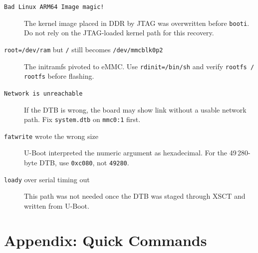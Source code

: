 \documentclass[a4paper,11pt]{article}
\begin{document}
\begin{description}
  \item[\texttt{Bad Linux ARM64 Image magic!}] The kernel image placed in DDR by JTAG was overwritten before \texttt{booti}. Do not rely on the JTAG-loaded kernel path for this recovery.
  \item[\texttt{root=/dev/ram} but \texttt{/} still becomes \texttt{/dev/mmcblk0p2}] The initramfs pivoted to eMMC. Use \texttt{rdinit=/bin/sh} and verify \texttt{rootfs / rootfs} before flashing.
  \item[\texttt{Network is unreachable}] If the DTB is wrong, the board may show link without a usable network path. Fix \texttt{system.dtb} on \texttt{mmc0:1} first.
  \item[\texttt{fatwrite} wrote the wrong size] U-Boot interpreted the numeric argument as hexadecimal. For the 49\,280-byte DTB, use \texttt{0xc080}, not \texttt{49280}.
  \item[\texttt{loady} over serial timing out] This path was not needed once the DTB was staged through XSCT and written from U-Boot.
\end{description}

\clearpage
\section*{Appendix: Quick Commands}
\end{document}
